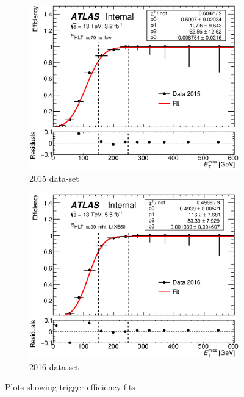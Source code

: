 \begin{figure}[!h]
\begin{subfigure}{0.5\textwidth}
   \includegraphics[width=\textwidth]{figures/xe70_tclcw_data15_fitted.eps}
\caption{2015 data-set}
\label{fig:trigFitA}
\end{subfigure} %
\begin{subfigure}{0.5\textwidth}
   \includegraphics[width=\textwidth]{figures/xe90_mht_data16_fitted.eps}
\caption{2016 data-set}
\label{fig:trigFitB}
\end{subfigure}
\caption{Plots showing trigger efficiency fits}
\end{figure}
